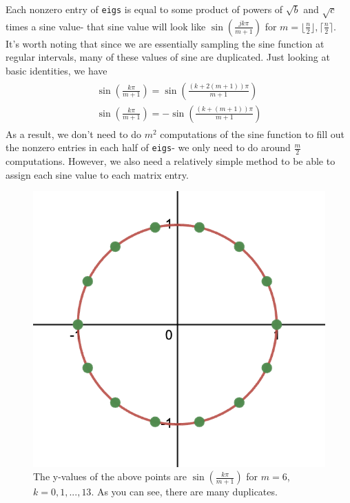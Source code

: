 \documentclass[10pt,twocolumn]{article}
\begin{document}
Each nonzero entry of \verb|eigs| is equal to some product of powers of $\sqrt{b}$ and $\sqrt{c}$ times a sine value- that sine value will look like $\sin(\frac{jk\pi}{m+1})$ for $m=\lfloor \frac{n}{2} \rfloor , \lceil \frac{n}{2} \rceil$. It's worth noting that since we are essentially sampling the sine function at regular intervals, many of these values of sine are duplicated. Just looking at basic identities, we have 
\begin{align}\tag{$\dagger$}
\begin{split}
    \sin(\frac{k\pi}{m+1})=\sin(\frac{(k+2(m+1))\pi}{m+1})\\
    \sin(\frac{k\pi}{m+1})=-\sin(\frac{(k+(m+1))\pi}{m+1})
\end{split}
\end{align}
As a result, we don't need to do $m^2$ computations of the sine function to fill out the nonzero entries in each half of \verb|eigs|- we only need to do around $\frac{m}{2}$ computations. However, we also need a relatively simple method to be able to assign each sine value to each matrix entry. 

\begin{figure} [h]
    \centering
    \includegraphics[scale=0.4]{unitcircle.png}
    \caption{The y-values of the above points are $\sin(\frac{k\pi}{m+1})$ for $m=6$, $k=0,1,...,13$. As you can see, there are many duplicates.}
    \label{fig:unit}
\end{figure}
\end{document}
